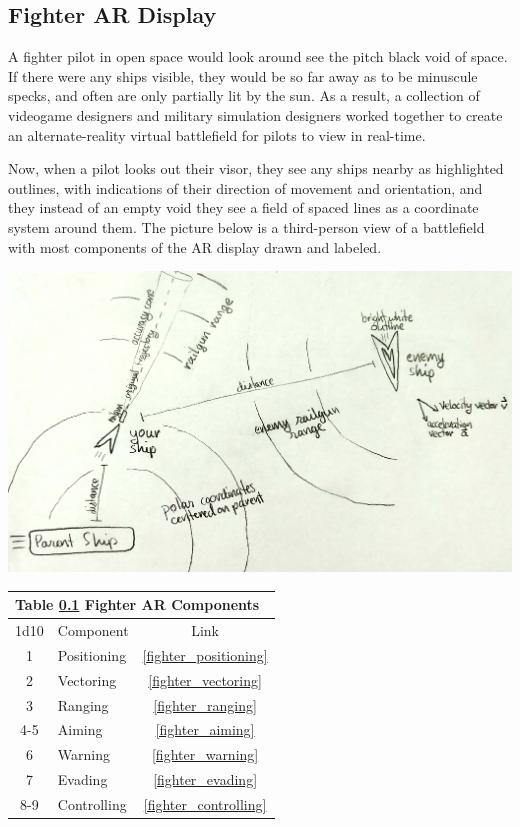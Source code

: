 \documentclass[a4paper]{article}
\begin{document}
\newpage
\subsection{Fighter AR Display} \label{fighter}

A fighter pilot in open space would look around see the pitch black void of space. If there were any ships visible, they would be so far away as to be minuscule specks, and often are only partially lit by the sun. As a result, a collection of videogame designers and military simulation designers worked together to create an alternate-reality virtual battlefield for pilots to view in real-time.

Now, when a pilot looks out their visor, they see any ships nearby as highlighted outlines, with indications of their direction of movement and orientation, and they instead of an empty void they see a field of spaced lines as a coordinate system around them. The picture below is a third-person view of a battlefield with most components of the AR display drawn and labeled.

\vspace{0.2cm}
\includegraphics[scale=0.3]{Fighter_AR_Display}

\vspace{0.5cm} \hspace{0.25\linewidth}
\def\fighter_components{
\begin{tabular}[t]{@{} | c | l | c | @{}}
\toprule
\multicolumn{3}{|l|}{Table \ref{fighter} Fighter AR Components} \\
\toprule
1d10 & Component & Link \\
\midrule
1 & Positioning & \ref{fighter_positioning} \\
2 & Vectoring & \ref{fighter_vectoring} \\
3 & Ranging & \ref{fighter_ranging} \\
4-5 & Aiming & \ref{fighter_aiming} \\
6 & Warning & \ref{fighter_warning} \\
7 & Evading & \ref{fighter_evading} \\
8-9 & Controlling & \ref{fighter_controlling} \\
\bottomrule
\end{tabular}
}
\fighter_components
\end{document}
